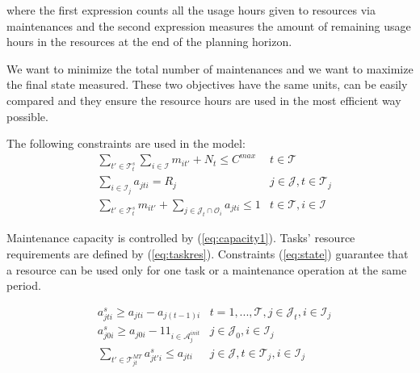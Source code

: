\documentclass[a4paper,onecolumn,fleqn]{article}
\begin{document}
    where the first expression counts all the usage hours given to resources via maintenances and the second expression measures the amount of remaining usage hours in the resources at the end of the planning horizon.

    We want to minimize the total number of maintenances and we want to maximize the final state measured. These two objectives have the same units, can be easily compared and they ensure the resource hours are used in the most efficient way possible.

    The following constraints are used in the model:       
    \begin{align}
        & \sum_{t' \in \mathcal{T}^{s}_t} \sum_{i \in \mathcal{I}} m_{it'} + N_t \leq C^{max}
          & t \in \mathcal{T} \label{eq:capacity1}\\
        & \sum_{i \in \mathcal{I}_j} a_{jti} = R_j
                & j \in \mathcal{J}, t \in \mathcal{T}_j  \label{eq:taskres}\\
        & \sum_{t' \in \mathcal{T}^{s}_t} m_{it'} + \sum_{j \in \mathcal{J}_t \cap \mathcal{O}_i} a_{jti} \leq 1 
                & t \in \mathcal{T}, i \in \mathcal{I} \label{eq:state}
    \end{align}


    Maintenance capacity is controlled by (\ref{eq:capacity1}). Tasks' resource requirements are defined by (\ref{eq:taskres}). Constraints (\ref{eq:state}) guarantee that a resource can be used only for one task or a maintenance operation at the same period.  

    \begin{align}
        & a^s_{jti} \geq a_{jti} - a_{j(t-1)i}
                & t =1, ..., \mathcal{T}, j \in \mathcal{J}_t, i \in \mathcal{I}_j \label{eq:start1} \\
        & a^s_{j0i} \geq a_{j0i} - 1 \!1_{i \in \mathcal{A}^{init}_{j}}
                & j \in \mathcal{J}_0, i \in \mathcal{I}_j \label{eq:start2} \\        
        & \sum_{t' \in \mathcal{T}^{MT}_{jt}} a^s_{jt'i} \leq a_{jti} 
        & j \in \mathcal{J}, t \in \mathcal{T}_j, i \in \mathcal{I}_j \label{eq:start3}
    \end{align}
\end{document}
